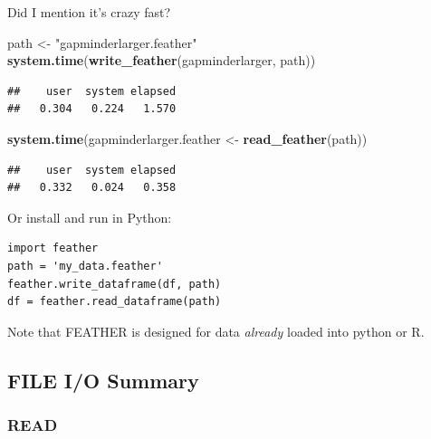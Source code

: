 \documentclass[]{article}
\newenvironment{Shaded}{\begin{snugshade}}{\end{snugshade}}
\newcommand{\KeywordTok}[1]{\textcolor[rgb]{0.13,0.29,0.53}{\textbf{{#1}}}}
\newcommand{\StringTok}[1]{\textcolor[rgb]{0.31,0.60,0.02}{{#1}}}
\newcommand{\NormalTok}[1]{{#1}}
\begin{document}
Did I mention it's crazy fast?

\begin{Shaded}
\begin{Highlighting}[]
\NormalTok{path <-}\StringTok{ "gapminderlarger.feather"}
\KeywordTok{system.time}\NormalTok{(}\KeywordTok{write_feather}\NormalTok{(gapminderlarger, path))}
\end{Highlighting}
\end{Shaded}

\begin{verbatim}
##    user  system elapsed 
##   0.304   0.224   1.570
\end{verbatim}

\begin{Shaded}
\begin{Highlighting}[]
\KeywordTok{system.time}\NormalTok{(gapminderlarger.feather <-}\StringTok{ }\KeywordTok{read_feather}\NormalTok{(path))}
\end{Highlighting}
\end{Shaded}

\begin{verbatim}
##    user  system elapsed 
##   0.332   0.024   0.358
\end{verbatim}

Or install and run in Python:

\begin{verbatim}
import feather
path = 'my_data.feather'
feather.write_dataframe(df, path)
df = feather.read_dataframe(path)
\end{verbatim}

Note that FEATHER is designed for data \emph{already} loaded into python
or R.

\subsection{FILE I/O Summary}\label{file-io-summary}

\subsubsection{READ}\label{read}
\end{document}

